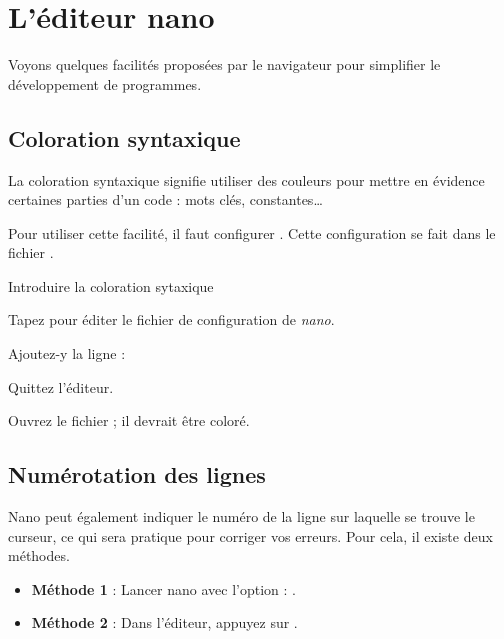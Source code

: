 \documentclass[a4paper,11pt]{style-esi/td}
\begin{document}
\newpage
\section{L'éditeur nano}

	Voyons quelques facilités proposées par le navigateur 
	pour simplifier le développement de programmes.

	\subsection{Coloration syntaxique}

		La coloration syntaxique signifie 
		utiliser des couleurs pour mettre en évidence certaines parties d'un code :
		mots clés, constantes\dots{}
	
		Pour utiliser cette facilité, 
		il faut configurer . 
		Cette configuration se fait dans le fichier .

		\begin{Tutoriel}{Introduire la coloration sytaxique} 
			\vspace{-1em}
			\begin{steps}
			\item 
				Tapez  
				pour éditer le fichier de configuration de \emph{nano}.
			\item 
				Ajoutez-y la ligne : 
			\item 
				Quittez l'éditeur.
			\item 
				Ouvrez le fichier ;
				il devrait être coloré.
			\end{steps}
		\end{Tutoriel}
				
	\subsection{Numérotation des lignes}
				
		Nano peut également indiquer le numéro de la ligne sur laquelle se trouve le curseur, 
		ce qui sera pratique pour corriger vos erreurs. 
		Pour cela, il existe deux méthodes.

		\begin{itemize} 
		\item \textbf{Méthode 1} : 
			Lancer nano avec l'option  : .
		\item \textbf{Méthode 2} : 
			Dans l'éditeur, appuyez sur .
		\end{itemize}
			
\end{document}
